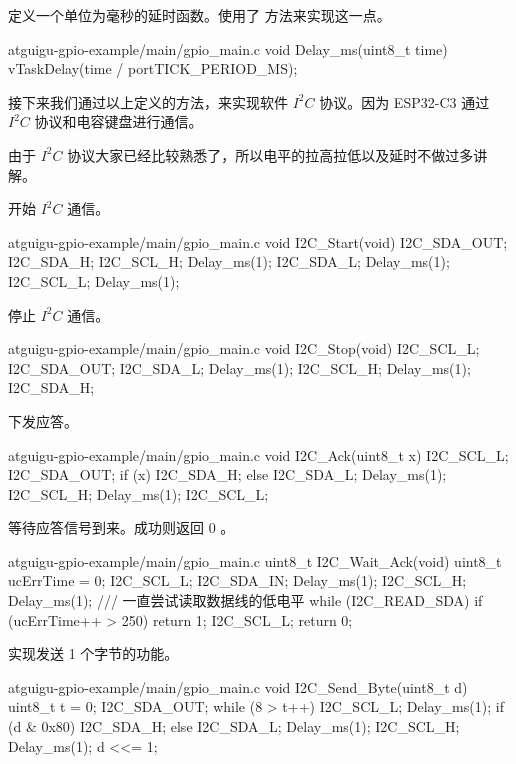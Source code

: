 \documentclass[lang=cn,newtx,10pt,scheme=chinese]{elegantbook}
\begin{document}
定义一个单位为毫秒的延时函数。使用了  方法来实现这一点。

\begin{mycode}{atguigu-gpio-example/main/gpio\_main.c}
void Delay_ms(uint8_t time)
{
    vTaskDelay(time / portTICK_PERIOD_MS);
}
\end{mycode}

接下来我们通过以上定义的方法，来实现软件 $I^2C$ 协议。因为 ESP32-C3 通过 $I^2C$ 协议和电容键盘进行通信。

由于 $I^2C$ 协议大家已经比较熟悉了，所以电平的拉高拉低以及延时不做过多讲解。

开始 $I^2C$ 通信。

\begin{mycode}{atguigu-gpio-example/main/gpio\_main.c}
void I2C_Start(void)
{
    I2C_SDA_OUT;
    I2C_SDA_H;
    I2C_SCL_H;
    Delay_ms(1);
    I2C_SDA_L;
    Delay_ms(1);
    I2C_SCL_L;
    Delay_ms(1);
}
\end{mycode}

停止 $I^2C$ 通信。

\begin{mycode}{atguigu-gpio-example/main/gpio\_main.c}
void I2C_Stop(void)
{
    I2C_SCL_L;
    I2C_SDA_OUT;
    I2C_SDA_L;
    Delay_ms(1);
    I2C_SCL_H;
    Delay_ms(1);
    I2C_SDA_H;
}
\end{mycode}

下发应答。

\begin{mycode}{atguigu-gpio-example/main/gpio\_main.c}
void I2C_Ack(uint8_t x)
{
    I2C_SCL_L;
    I2C_SDA_OUT;
    if (x)
    {
        I2C_SDA_H;
    }
    else
    {
        I2C_SDA_L;
    }
    Delay_ms(1);
    I2C_SCL_H;
    Delay_ms(1);
    I2C_SCL_L;
}
\end{mycode}

等待应答信号到来。成功则返回 0 。

\begin{mycode}{atguigu-gpio-example/main/gpio\_main.c}
uint8_t I2C_Wait_Ack(void)
{
    uint8_t ucErrTime = 0;
    I2C_SCL_L;
    I2C_SDA_IN;
    Delay_ms(1);
    I2C_SCL_H;
    Delay_ms(1);
    /// 一直尝试读取数据线的低电平
    while (I2C_READ_SDA)
    {
        if (ucErrTime++ > 250)
        {
            return 1;
        }
    }
    I2C_SCL_L;
    return 0;
}
\end{mycode}

实现发送 1 个字节的功能。

\begin{mycode}{atguigu-gpio-example/main/gpio\_main.c}
void I2C_Send_Byte(uint8_t d)
{
    uint8_t t = 0;
    I2C_SDA_OUT;
    while (8 > t++)
    {
        I2C_SCL_L;
        Delay_ms(1);
        if (d & 0x80)
        {
            I2C_SDA_H;
        }
        else
        {
            I2C_SDA_L;
        }
        Delay_ms(1);
        I2C_SCL_H;
        Delay_ms(1);
        d <<= 1;
    }
}
\end{mycode}
\end{document}
